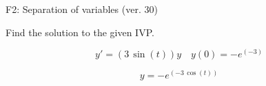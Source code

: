 \begin{exercise}
  \begin{exerciseTitle}F2: Separation of variables (ver. 30)\end{exerciseTitle}
  \begin{exerciseStatement}
    
Find the solution to the given IVP.

    
\[y'=( 3 \, \sin\left(t\right) )y\hspace{1em} y(0)= -e^{\left(-3\right)}\]

  \end{exerciseStatement}
  \begin{exerciseAnswer}
    
\[y= -e^{\left(-3 \, \cos\left(t\right)\right)}\]

  \end{exerciseAnswer}
\end{exercise}